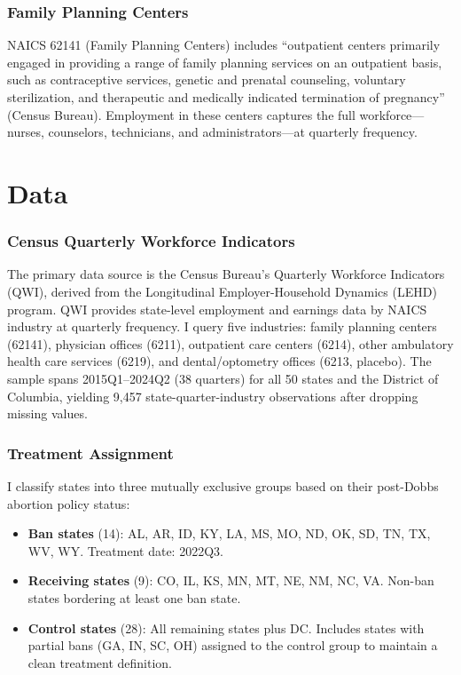 \documentclass[12pt]{article}
\begin{document}
\subsubsection*{Family Planning Centers}
NAICS 62141 (Family Planning Centers) includes ``outpatient centers primarily engaged in providing a range of family planning services on an outpatient basis, such as contraceptive services, genetic and prenatal counseling, voluntary sterilization, and therapeutic and medically indicated termination of pregnancy'' (Census Bureau). Employment in these centers captures the full workforce---nurses, counselors, technicians, and administrators---at quarterly frequency.


\section{Data}
\label{sec:data}

\subsubsection*{Census Quarterly Workforce Indicators}
The primary data source is the Census Bureau's Quarterly Workforce Indicators (QWI), derived from the Longitudinal Employer-Household Dynamics (LEHD) program. QWI provides state-level employment and earnings data by NAICS industry at quarterly frequency. I query five industries: family planning centers (62141), physician offices (6211), outpatient care centers (6214), other ambulatory health care services (6219), and dental/optometry offices (6213, placebo). The sample spans 2015Q1--2024Q2 (38 quarters) for all 50 states and the District of Columbia, yielding 9,457 state-quarter-industry observations after dropping missing values.

\subsubsection*{Treatment Assignment}
I classify states into three mutually exclusive groups based on their post-Dobbs abortion policy status:
\begin{itemize}
\item \textbf{Ban states} (14): AL, AR, ID, KY, LA, MS, MO, ND, OK, SD, TN, TX, WV, WY. Treatment date: 2022Q3.
\item \textbf{Receiving states} (9): CO, IL, KS, MN, MT, NE, NM, NC, VA. Non-ban states bordering at least one ban state.
\item \textbf{Control states} (28): All remaining states plus DC. Includes states with partial bans (GA, IN, SC, OH) assigned to the control group to maintain a clean treatment definition.
\end{itemize}
\end{document}
